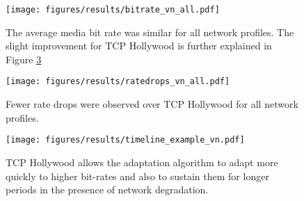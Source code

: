 \begin{figure}
  \centering
  \texttt{[image: figures/results/bitrate\_vn\_all.pdf]}
  \caption{The average media bit rate was similar for all network profiles. The slight improvement for TCP Hollywood is further explained in Figure \ref{fig:adaptation_profile} }
  \label{fig:rate_profiles}
\end{figure}


\begin{figure}
  \centering
  \texttt{[image: figures/results/ratedrops\_vn\_all.pdf]}
  \caption{Fewer rate drops were observed over TCP Hollywood for all network profiles.}
  \label{fig:ratechange_profiles}
\end{figure}

\begin{figure}
  \centering
  \texttt{[image: figures/results/timeline\_example\_vn.pdf]}
  \caption{TCP Hollywood allows the adaptation algorithm to adapt more quickly to higher bit-rates and also to sustain them for longer periods in the presence of network degradation. }
  \label{fig:adaptation_profile}
\end{figure}
